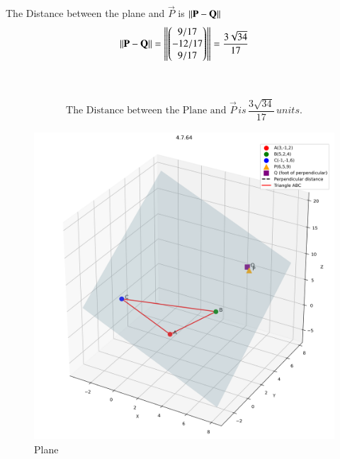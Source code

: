 \documentclass[journal]{IEEEtran}
\begin{document}
The Distance between the plane and $\vec{P}$ is $\left\lVert\mathbf{P} - \mathbf{Q}\right\rVert$
\begin{equation}
\left\lVert\mathbf{P} - \mathbf{Q}\right\rVert= \left\lVert\begin{pmatrix}9/17 \\ -12/17 \\ 9/17\end{pmatrix}\right\rVert = \dfrac{3\sqrt{34}}{17}
\end{equation}\\\\


\begin{align}
    \boxed{\text{The Distance between the Plane and } \vec{P} \, is \, \dfrac{3\sqrt{34}}{17} \, units.}
\end{align}


\begin{figure}[htbp]
    \centering
    \includegraphics[width=\columnwidth]{figs/fig1.png}
    \caption{Plane}
    \label{fig:fig/fig1.png}
\end{figure}
\end{document}
